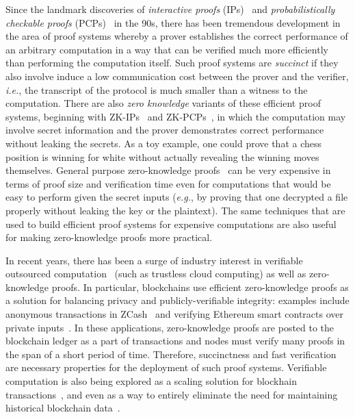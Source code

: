 
Since the landmark discoveries of \emph{interactive proofs} (IPs)~\cite{STOC:GolMicRac85} and %
\emph{probabilistically checkable proofs} (PCPs)~\cite{STOC:BFLS91,FOCS:ALMSS92} in the 90s, there has been tremendous development in the area of proof systems whereby a prover establishes the correct performance of an arbitrary computation in a way that can be verified much more efficiently than performing the computation itself. Such proof systems are \emph{succinct} if they also involve induce a low communication cost between the prover and the verifier, \emph{i.e.}, the transcript of the protocol is much smaller than a witness to the computation. There are also \emph{zero knowledge} variants of these efficient proof systems, beginning with ZK-IPs~\cite{C:BGGHKMR88} and ZK-PCPs~\cite{STOC:Kilian92}, in which the computation may involve secret information and the prover demonstrates correct performance without leaking the secrets. As a toy example, one could prove that a chess position is winning for white without actually revealing the winning moves themselves. General purpose zero-knowledge proofs~\cite{JACM:GMW91} can be very expensive in terms of proof size and verification time even for computations that would be easy to perform given the secret inputs (\emph{e.g.}, by proving that one decrypted a file properly without leaking the key or the plaintext). The same techniques that are used to build efficient proof systems for expensive computations are also useful for making zero-knowledge proofs more practical. 
 
In recent years, there has been a surge of industry interest in verifiable outsourced computation~\cite{WalBlu15} (such as trustless cloud computing) as well as zero-knowledge proofs. In particular, blockchains use efficient zero-knowledge proofs as a solution for balancing privacy and publicly-verifiable integrity: examples include anonymous transactions in ZCash~\cite{SP:BCGGMT14,Zcash} and verifying Ethereum smart contracts over private inputs~\cite{Zokrates}. In these applications, zero-knowledge proofs are posted to the blockchain ledger as a part of transactions and nodes must verify many proofs in the span of a short period of time. Therefore, succinctness and fast verification are necessary properties for the deployment of such proof systems. Verifiable computation is also being explored as a scaling solution for blockhain transactions~\cite{ZK-rollup}, and even as a way to entirely eliminate the need for maintaining historical blockchain data~\cite{Coda}. 

